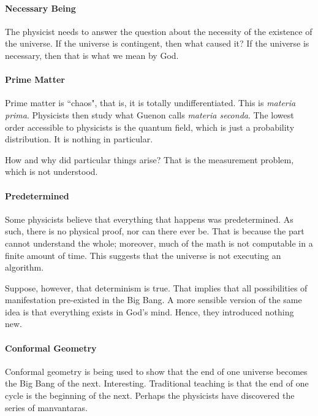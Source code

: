 \paragraph{Necessary Being}
The physicist needs to answer the question about the necessity of the existence of the universe. If the universe is contingent, then what caused it? If the universe is necessary, then that is what we mean by God.

\paragraph{Prime Matter}
Prime matter is ``chaos", that is, it is totally undifferentiated. This is \emph{materia prima}. Physicists then study what Guenon calls \emph{materia seconda}. The lowest order accessible to physicists is the quantum field, which is just a probability distribution. It is nothing in particular.

How and why did particular things arise? That is the measurement problem, which is not understood.

\paragraph{Predetermined}
Some physicists believe that everything that happens was predetermined. As such, there is no physical proof, nor can there ever be. That is because the part cannot understand the whole; moreover, much of the math is not computable in a finite amount of time. This suggests that the universe is not executing an algorithm.

Suppose, however, that determinism is true. That implies that all possibilities of manifestation pre-existed in the Big Bang. A more sensible version of the same idea is that everything exists in God's mind. Hence, they introduced nothing new.

\paragraph{Conformal Geometry}
Conformal geometry is being used to show that the end of one universe becomes the Big Bang of the next. Interesting. Traditional teaching is that the end of one cycle is the beginning of the next. Perhaps the physicists have discovered the series of manvantaras.



